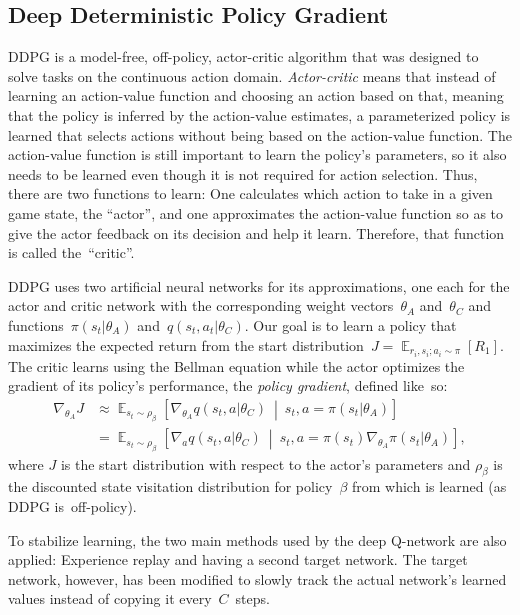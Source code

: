 \documentclass[a4paper,titlepage]{article}
\DeclareMathOperator{\Expectation}{\mathbb{E}}
\newcommand{\Exp}[3]{\Expectation_{#1} \left[ #2 \ \middle| \ #3 \right]}
\newcommand{\Ex}[2]{\Expectation_{#1} \left[ #2 \right]}
\begin{document}
\subsection{Deep Deterministic Policy Gradient}

DDPG is a model-free, off-policy, actor-critic algorithm that was designed to solve tasks on the continuous action domain. \emph{Actor-critic} means that instead of learning an action-value function and choosing an action based on that, meaning that the policy is inferred by the action-value estimates, a parameterized policy is learned that selects actions without being based on the action-value function. The action-value function is still important to learn the policy's parameters, so it also needs to be learned even though it is not required for action selection. Thus, there are two functions to learn: One calculates which action to take in a given game state, the ``actor'', and one approximates the action-value function so as to give the actor feedback on its decision and help it learn. Therefore, that function is called the~``critic''.

DDPG uses two artificial neural networks for its approximations, one each for the actor and critic network with the corresponding weight vectors~$\theta_A$ and~$\theta_C$ and functions~$\pi(s_t | \theta_A)$ and~$q(s_t, a_t | \theta_C)$. Our goal is to learn a policy that maximizes the expected return from the start distribution~$J = \Ex{r_i, s_i; a_i \sim \pi}{R_1}$. The critic learns using the Bellman equation while the actor optimizes the gradient of its policy's performance, the \emph{policy gradient}, defined like~so:
\begin{align*}
  \nabla_{\theta_A} J &\approx \Exp{s_t \sim \rho_\beta}{\nabla_{\theta_A} q(s_t, a | \theta_C)}{s_t, a = \pi(s_t | \theta_A)} \\
  &= \Exp{s_t \sim \rho_\beta}{\nabla_a q(s_t, a | \theta_C)}{s_t, a = \pi(s_t) \nabla_{\theta_A} \pi(s_t | \theta_A)},
\end{align*}
where $J$ is the start distribution with respect to the actor's parameters and $\rho_\beta$ is the discounted state visitation distribution for policy~$\beta$ from which is learned (as DDPG is~off-policy).

To stabilize learning, the two main methods used by the deep Q-network are also applied: Experience replay and having a second target network. The target network, however, has been modified to slowly track the actual network's learned values instead of copying it every~$C$~steps.
\end{document}
